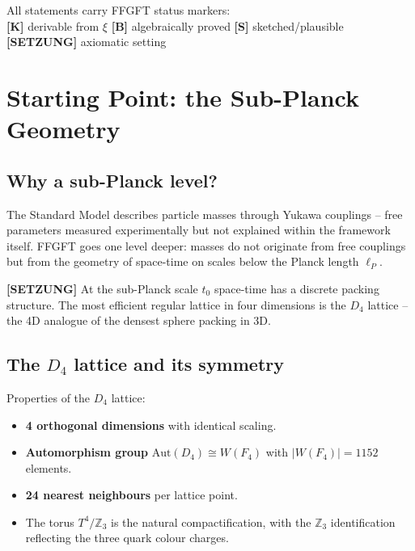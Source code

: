\begin{keyresult}
All statements carry FFGFT status markers:\\
\textbf{[K]} derivable from $\xi$ \quad
\textbf{[B]} algebraically proved \quad
\textbf{[S]} sketched/plausible \quad
\textbf{[SETZUNG]} axiomatic setting
\end{keyresult}

\section{Starting Point: the Sub-Planck Geometry}

\subsection{Why a sub-Planck level?}

The Standard Model describes particle masses through Yukawa
couplings -- free parameters measured experimentally but not
explained within the framework itself. FFGFT goes one level deeper:
masses do not originate from free couplings but from the geometry of
space-time on scales below the Planck length $\ell_P$.

\textbf{[SETZUNG]} At the sub-Planck scale $t_0$ space-time has a
discrete packing structure. The most efficient regular lattice in four
dimensions is the $D_4$ lattice -- the 4D analogue of the densest
sphere packing in 3D.

\subsection{The $D_4$ lattice and its symmetry}

Properties of the $D_4$ lattice:
\begin{itemize}
  \item \textbf{4 orthogonal dimensions} with identical scaling.
  \item \textbf{Automorphism group} $\mathrm{Aut}(D_4) \cong W(F_4)$
    with $|W(F_4)| = 1152$ elements.
  \item \textbf{24 nearest neighbours} per lattice point.
  \item The torus $T^4/\mathbb{Z}_3$ is the natural compactification,
    with the $\mathbb{Z}_3$ identification reflecting the three quark
    colour charges.
\end{itemize}

